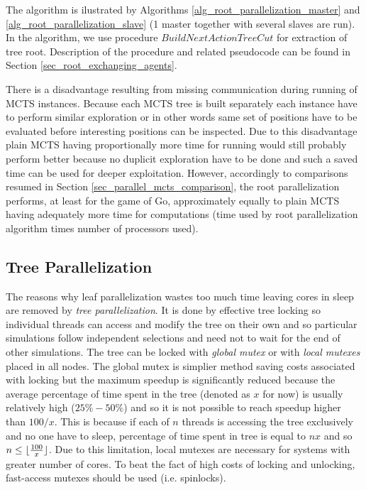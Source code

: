 The algorithm is ilustrated by Algorithms \ref{alg_root_parallelization_master} and 
\ref{alg_root_parallelization_slave} (1 master together with several slaves are run). 
In the algorithm, we use 
procedure $BuildNextActionTreeCut$ for extraction of tree root. Description of the procedure
and related pseudocode can be found in Section \ref{sec_root_exchanging_agents}.

There is a disadvantage resulting from missing communication during running of MCTS
instances. Because each MCTS tree is built separately each instance have to perform similar
exploration or in other words same set of positions have to be evaluated before interesting
positions can be inspected. Due to this disadvantage plain MCTS having proportionally more time for
running would still probably perform better because no duplicit exploration have to be done and such
a saved time can be used for deeper exploitation. However, accordingly to comparisons resumed
in Section \ref{sec_parallel_mcts_comparison}, the root parallelization performs, at least for the 
game of Go, approximately equally to plain MCTS having adequately more time for computations
(time used by root parallelization algorithm times number of processors used).



\subsection{Tree Parallelization}


The reasons why leaf parallelization wastes too much time leaving cores in sleep are removed by
\emph{tree parallelization}. It is done by effective tree locking so individual threads can access
and modify the tree on their own and so particular simulations follow independent selections and
need not to wait for the end of other simulations. The tree can be locked with \emph{global mutex}
or with \emph{local mutexes} placed in all nodes. The global mutex is simplier method saving costs
associated with locking but the maximum speedup is significantly reduced because the average
percentage of time spent in the tree (denoted as $x$ for now) is usually relatively high ($25\%-50\%$) 
and
so it is not possible to reach speedup higher than $100/x$. This is because if each of $n$
threads is
accessing the tree exclusively and no one have to sleep, percentage of time spent in 
tree is
equal to $n x$ and so $n \le \lfloor {100 \over{x}} \rfloor$. Due to this limitation, local mutexes
are necessary for systems with greater number of cores. To beat the fact of high costs of locking and
unlocking, fast-access mutexes should be used (i.e. spinlocks).


